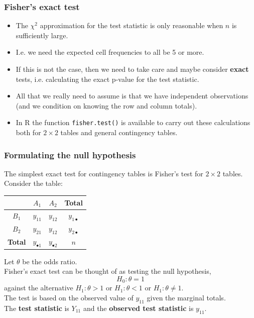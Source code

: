 \documentclass[a4paper]{article}
\begin{document}
\subsubsection{Fisher's exact test}
\begin{itemize}
	\item The \( \chi^2 \) approximation for the test statistic is only reasonable when \( n \) is sufficiently large.
	\item I.e. we need the expected cell frequencies to all be 5 or more.
	\item If this is not the case, then we need to take care and maybe consider \textbf{exact} tests, i.e. calculating the exact p-value for the test statistic.
	\item All that we really need to assume is that we have independent observations (and we condition on knowing the row and column totals).
	\item In R the function \lstinline|fisher.test()|  is available to carry out these calculations both for \( 2 \times 2 \) tables and general contingency tables.
\end{itemize}
\subsubsection{Formulating the null hypothesis}
The simplest exact test for contingency tables is Fisher's test for \( 2 \times 2 \) tables.
Consider the table:
\begin{table}[H]
	\centering
	\begin{tabular}{@{}c|cc|c@{}}
	\toprule
				   & \( A_1 \)          & \( A_2 \)          & \textbf{Total}     \\ \midrule
	\( B_1 \)      & \( y_{11} \)       & \( y_{12} \)       & \( y_{1\bullet} \) \\
	\( B_2 \)      & \( y_{21} \)       & \( y_{12} \)       & \( y_{2\bullet} \) \\ \midrule
	\textbf{Total} & \( y_{\bullet1} \) & \( y_{\bullet2} \) & \( n \)            \\ \bottomrule
	\end{tabular}
\end{table}
Let \( \theta \) be the \textcolor{myred}{odds ratio}.\\
Fisher's exact test can be thought of as testing the null hypothesis,
\[
	H_0: \theta = 1
\]
against the alternative \( H_1: \theta > 1 \) or \( H_1: \theta < 1 \) or \( H_1: \theta \neq 1 \).\\
The test is based on the observed value of \( y_{11} \) given the marginal totals.\\
The \textbf{test statistic} is \( Y_{11} \) and the \textbf{observed test statistic} is \( y_{11} \).
\end{document}
